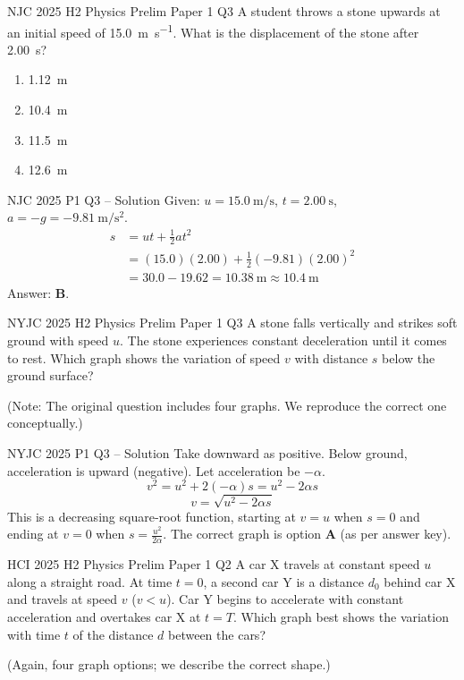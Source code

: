 \documentclass{beamer}
\begin{document}
\begin{frame}[t,shrink=15]{NJC 2025 H2 Physics Prelim Paper 1 Q3}
A student throws a stone upwards at an initial speed of \SI{15.0}{\meter\per\second}.
What is the displacement of the stone after \SI{2.00}{\second}?
\begin{enumerate}[A]
    \item \SI{1.12}{\meter}
    \item \SI{10.4}{\meter}
    \item \SI{11.5}{\meter}
    \item \SI{12.6}{\meter}
\end{enumerate}
\end{frame}

\begin{frame}[shrink=15]{NJC 2025 P1 Q3 – Solution}
Given: $u = \SI{15.0}{\meter\per\second}$, $t = \SI{2.00}{\second}$, $a = -g = -\SI{9.81}{\meter\per\second\squared}$.
\begin{align*}
s &= ut + \frac12 at^2 \\
  &= (15.0)(2.00) + \frac12 (-9.81)(2.00)^2 \\
  &= 30.0 - 19.62 = \SI{10.38}{\meter} \approx \SI{10.4}{\meter}
\end{align*}
Answer: \textbf{B}.
\end{frame}

\begin{frame}[t,shrink=15]{NYJC 2025 H2 Physics Prelim Paper 1 Q3}
A stone falls vertically and strikes soft ground with speed $u$. The stone experiences constant deceleration until it comes to rest. Which graph shows the variation of speed $v$ with distance $s$ below the ground surface?

(Note: The original question includes four graphs. We reproduce the correct one conceptually.)
\end{frame}

\begin{frame}[shrink=15]{NYJC 2025 P1 Q3 – Solution}
Take downward as positive. Below ground, acceleration is upward (negative). Let acceleration be $-\alpha$.
\[ v^2 = u^2 + 2(-\alpha)s = u^2 - 2\alpha s \]
\[ v = \sqrt{u^2 - 2\alpha s} \]
This is a decreasing square‑root function, starting at $v = u$ when $s = 0$ and ending at $v = 0$ when $s = \frac{u^2}{2\alpha}$. The correct graph is option \textbf{A} (as per answer key).
\end{frame}

\begin{frame}[t,shrink=15]{HCI 2025 H2 Physics Prelim Paper 1 Q2}
A car X travels at constant speed $u$ along a straight road. At time $t = 0$, a second car Y is a distance $d_0$ behind car X and travels at speed $v$ ($v < u$). Car Y begins to accelerate with constant acceleration and overtakes car X at $t = T$. Which graph best shows the variation with time $t$ of the distance $d$ between the cars?

(Again, four graph options; we describe the correct shape.)
\end{frame}
\end{document}
